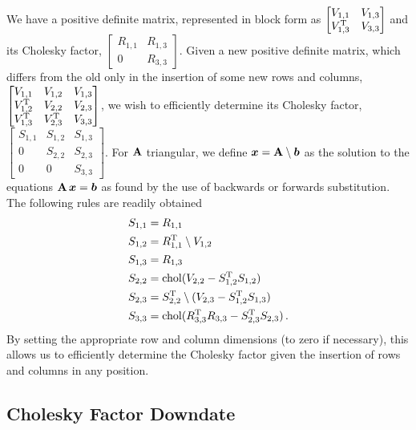 \documentclass{acmtrans2m}
\begin{document}
\noindent We have a positive definite matrix, represented in block form as $\begin{bmatrix} V_{1,1} & V_{1,3} \\ V^{\mathrm{T}}_{1,3} & V_{3,3} \end{bmatrix}$ and its Cholesky factor, $\begin{bmatrix} R_{1,1} & R_{1,3} \\ 0 & R_{3,3} \end{bmatrix}$. Given a new positive definite matrix, which differs from the old only in the insertion of some new rows and columns,$\begin{bmatrix} V_{1,1} & V_{1,2} & V_{1,3} \\ V^{\mathrm{T}}_{1,2} & V_{2,2} & V_{2,3} \\ V^{\mathrm{T}}_{1,3} & V^{\mathrm{T}}_{2,3} & V_{3,3} \end{bmatrix}
$, we wish to efficiently determine its Cholesky factor, $\begin{bmatrix} S_{1,1} & S_{1,2} & S_{1,3} \\ 0 & S_{2,2} & S_{2,3} \\ 0 & 0 & S_{3,3} \end{bmatrix}
$. For $\mathbf{A}$ triangular, we define $\boldsymbol{x}=\mathbf{A}\setminus \boldsymbol{b}$ as the solution to the equations $\mathbf{A}\,\boldsymbol{x}=\boldsymbol{b}$ as found by the use of backwards or forwards substitution. The following rules are readily obtained
\begin{align}
 S_{1,1}&=R_{1,1}\\
S_{1,2} &=R^{\mathrm{T}}_{1,1}\setminus V_{1,2}\\
S_{1,3} &=R_{1,3}\\
S_{2,2} &=\operatorname{chol} (V_{2,2}-S^{\mathrm{T}}_{1,2}S_{1,2})\\
S_{2,3} &=S^{\mathrm{T}}_{2,2}\setminus (V_{2,3}-S^{\mathrm{T}}_{1,2}S_{1,3})\\
S_{3,3} &=\operatorname{chol} (R^{\mathrm{T}}_{3,3}R_{3,3}-S^{\mathrm{T}}_{2,3}S_{2,3}) \,.
\end{align}
By setting the appropriate row and column dimensions (to zero if necessary), this allows us to efficiently determine the Cholesky factor given the insertion of rows and columns in any position. 

\subsection{Cholesky Factor Downdate}
\end{document}
